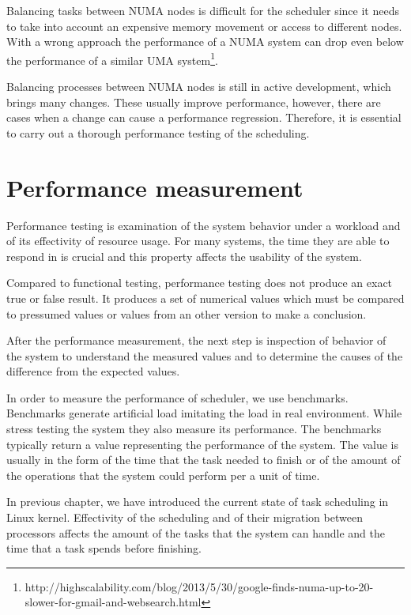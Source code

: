 Balancing tasks between NUMA nodes is difficult for the scheduler since it needs
to take into account an expensive memory movement or access to different nodes.
With a wrong approach the performance of a NUMA system can drop even below the
performance of a similar UMA
system\footnote{http://highscalability.com/blog/2013/5/30/google-finds-numa-up-to-20-slower-for-gmail-and-websearch.html}.

Balancing processes between NUMA nodes is still in active development, which
brings many changes. These usually improve performance, however, there are cases
when a change can cause a performance regression. Therefore, it is essential to
carry out a thorough performance testing of the scheduling.




\chapter{Performance measurement} \label{ch:measurement}
Performance testing is examination of the system behavior under a workload and of its
effectivity of resource usage. For many systems, the time they are able to
respond in is crucial and this property affects the usability of the system.

Compared to functional testing, performance testing does not produce an exact true
or false result. It produces a set of numerical values which must be compared to
pressumed values or values from an other version to make a conclusion.

After the performance measurement, the next step is inspection of behavior of
the system to understand the measured values and to determine the causes of the
difference from the expected values.

In order to measure the performance of scheduler, we use benchmarks.
Benchmarks generate artificial load imitating the load in real environment.
While stress testing the system they also measure its performance. The benchmarks
typically return a value representing the performance of the system. The value
is usually in the form of the time that the task needed to finish or of the amount of
the operations that the system could perform per a unit of time.

In previous chapter, we have introduced the current state of task scheduling in
Linux kernel.
Effectivity of the scheduling and of their migration between processors affects
the amount of the tasks that the system can handle and the time that a task
spends before finishing.

